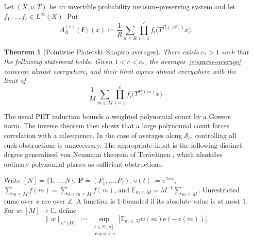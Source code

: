 \documentclass{amsart}
\newcommand{\E}{\mathbb E}
\newcommand{\Z}{\mathbb Z}
\newcommand{\C}{\mathbb C}
\newcommand{\1}{\mathbf 1}
\newcommand{\e}{\mathrm e}
\newcommand{\calS}{\mathcal S}
\newtheorem{theorem}{Theorem}[section]
\begin{document}
 Let $(X,\nu,T)$ be an invertible probability measure-preserving system and
let $f_1,\ldots,f_\ell\in L^\infty(X)$.  Put
\begin{equation}\label{e:sparse-average}
 A_R^{(c)}(\mathbf f)(x):=
 \frac1R\sum_{n\leq R}\prod_{i=1}^{\ell}
 f_i\bigl(T^{P_i(\lfloor n^c\rfloor)}x\bigr).
\end{equation}
\begin{theorem}[Pointwise Piatetski--Shapiro averages]
\label{t:pointwise}
There exists $c_*>1$ such that the following statement  holds. Given $1<c<c_*$, the
averages~\eqref{e:sparse-average} converge almost everywhere, and their
limit agrees almost everywhere with the limit of
\begin{equation}\label{e:integer-average}
 \frac1M\sum_{m\leq M}\prod_{i=1}^{\ell}
 f_i\bigl(T^{P_i(m)}x\bigr).
\end{equation}
\end{theorem}

The usual PET induction bounds a weighted polynomial count by a 
Gowers norm. The inverse theorem then shows that a large polynomial count forces correlation
with a nilsequence.  In the case of averages along $\calS_c$, controlling
all such obstructions is unnecessary.  The appropriate input is the
following distinct-degree generalized von Neumann theorem of
Ter\"av\"ainen \cite[Theorem 4.1]{Teravainen}, which identifies ordinary polynomial phases as sufficient
obstructions. 

Write \([N]=\{1,\ldots,N\}\), \(\mathbf P=(P_1,\ldots,P_\ell)\), $\e(t):=e^{2\pi i t}$, $\sum_{m\le M} f(m) =\sum_{0<m\le M} f(m)$,
and \(\E_{m\leq M}=M^{-1}\sum_{m\leq M}\).
Unrestricted sums over \(x\) are over \(\Z\).
A function is \(1\)-bounded if its absolute value is at most \(1\).  For $w:[M]\to\C$, define
\begin{equation}\label{e:little-u}
 \|w\|_{u^s[M]}:=
 \sup_{\substack{\phi\in\mathbb R[y]\\ \deg\phi<s}}
 \left|\E_{m\leq M}w(m)\e(-\phi(m))\right|.
\end{equation}
\end{document}
